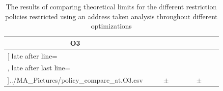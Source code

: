 \begin{table}[!htbp]
{\begin{tabular}{l|c|rcl|c|rcl|c}
\multicolumn{1}{c}{\bfseries O3}
	\\\midrule
	\csvreader[ late after line=\\, late after last line=\\\bottomrule]{../MA_Pictures/policy_compare_at.O3.csv}{
}
	{\csvcolii  &  \csvcoliii & \csvcolx & $\pm$ & \csvcolxi & \csvcolxii & \csvcolxix & $\pm$ & \csvcolxx& \csvcolxxi}%

    	\end{tabular}
}
		\caption {The results of comparing theoretical limits for the different restriction policies restricted using an address taken analysis throughout different optimizations}
		\label{tbl:policycompat}
\end{table}



